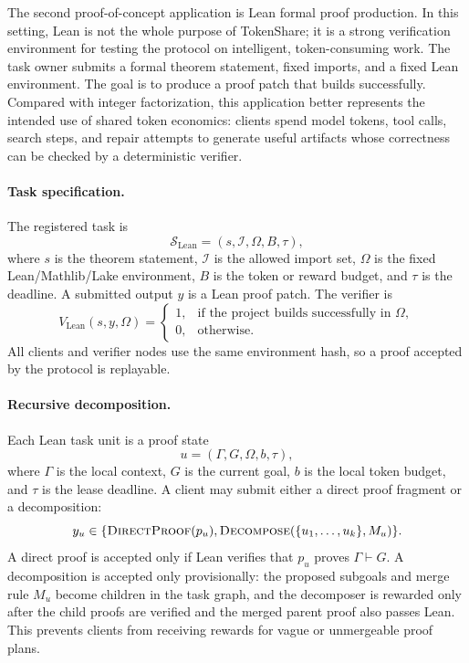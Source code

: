 \documentclass{article}
\theoremstyle{plain}
\begin{document}
{The second proof-of-concept application is Lean formal proof production. In this setting, Lean is not the whole purpose of TokenShare; it is a strong verification environment for testing the protocol on intelligent, token-consuming work. The task owner submits a formal theorem statement, fixed imports, and a fixed Lean environment. The goal is to produce a proof patch that builds successfully. Compared with integer factorization, this application better represents the intended use of shared token economics: clients spend model tokens, tool calls, search steps, and repair attempts to generate useful artifacts whose correctness can be checked by a deterministic verifier.

\paragraph{Task specification.}
The registered task is
\[
\mathcal{S}_{\mathrm{Lean}}=(s,\mathcal{I},\Omega,B,\tau),
\]
where $s$ is the theorem statement, $\mathcal{I}$ is the allowed import set, $\Omega$ is the fixed Lean/Mathlib/Lake environment, $B$ is the token or reward budget, and $\tau$ is the deadline. A submitted output $y$ is a Lean proof patch. The verifier is
\[
V_{\mathrm{Lean}}(s,y,\Omega)=
\begin{cases}
1, & \text{if the project builds successfully in } \Omega,\\
0, & \text{otherwise}.
\end{cases}
\]
All clients and verifier nodes use the same environment hash, so a proof accepted by the protocol is replayable.

\paragraph{Recursive decomposition.}
Each Lean task unit is a proof state
\[
u=(\Gamma,G,\Omega,b,\tau),
\]
where $\Gamma$ is the local context, $G$ is the current goal, $b$ is the local token budget, and $\tau$ is the lease deadline. A client may submit either a direct proof fragment or a decomposition:
\[
y_u \in \{\textsc{DirectProof}(p_u),\textsc{Decompose}(\{u_1,\ldots,u_k\},M_u)\}.
\]
A direct proof is accepted only if Lean verifies that $p_u$ proves $\Gamma\vdash G$. A decomposition is accepted only provisionally: the proposed subgoals and merge rule $M_u$ become children in the task graph, and the decomposer is rewarded only after the child proofs are verified and the merged parent proof also passes Lean. This prevents clients from receiving rewards for vague or unmergeable proof plans.

}
\end{document}
